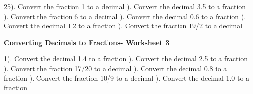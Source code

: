 \documentclass{article}%
\begin{document}
25). Convert the fraction 1 to a decimal%
\newline%
\newline%
). Convert the decimal 3.5 to a fraction%
\newline%
\newline%
). Convert the fraction 6 to a decimal%
\newline%
\newline%
). Convert the decimal 0.6 to a fraction%
\newline%
\newline%
). Convert the decimal 1.2 to a fraction%
\newline%
\newline%
). Convert the fraction 19/2 to a decimal%
\newline%
\newline%
\newline%
\pagebreak%
\large%
\begin{center}%
\textbf{Converting Decimals to Fractions- Worksheet 3}%
\newline%
\newline%
\newline%
\end{center} \normalsize%
1). Convert the decimal 1.4 to a fraction%
\newline%
\newline%
). Convert the decimal 2.5 to a fraction%
\newline%
\newline%
). Convert the fraction 17/20 to a decimal%
\newline%
\newline%
). Convert the decimal 0.8 to a fraction%
\newline%
\newline%
). Convert the fraction 10/9 to a decimal%
\newline%
\newline%
). Convert the decimal 1.0 to a fraction%
\newline%
\newline%
\end{document}
